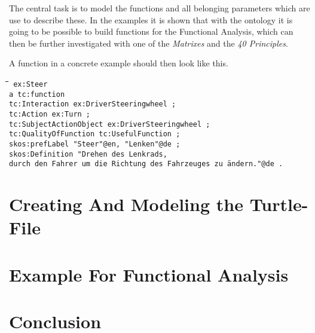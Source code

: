 \documentclass[11pt,a4paper]{article}
\newenvironment{code}{\tt \begin{tabbing}
\hskip12pt\=\hskip12pt\=\hskip12pt\=\hskip12pt\=\hskip5cm\=\hskip5cm\=\kill}
{\end{tabbing}}
\begin{document}
The central task is to model the functions and all belonging parameters which are use to describe these.
In the examples it is shown that with the ontology it is going to be possible to build functions for the Functional Analysis, which can then be further investigated with one of the \textit{Matrixes} and the \textit{40 Principles}.

A function in a concrete example should then look like this.
\begin{code}\tt
ex:Steer \\
\> a tc:function \\
\> tc:Interaction ex:DriverSteeringwheel ; \\
\> tc:Action ex:Turn ; \\
\> tc:SubjectActionObject ex:DriverSteeringwheel ; \\
\> tc:QualityOfFunction tc:UsefulFunction ; \\
\> skos:prefLabel "Steer"@en, "Lenken"@de ; \\
\> skos:Definition "Drehen des Lenkrads, \\
\> \> \> durch den Fahrer um die Richtung des Fahrzeuges zu ändern."@de .
\end{code}






\section{Creating And Modeling the Turtle-File}
\label{sec:turtle_file}

\section{Example For Functional Analysis}
\label{sec:examples}

\section{Conclusion}
\label{sec:conclusion}
\end{document}

